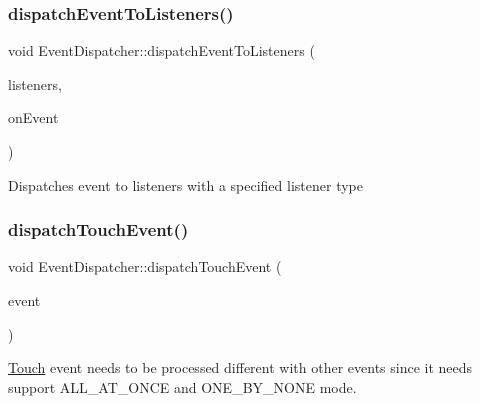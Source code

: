 \subsubsection{\texorpdfstring{dispatch\+Event\+To\+Listeners()}{dispatchEventToListeners()}\hspace{0.1cm}{\footnotesize\ttfamily [2/2]}}
{\footnotesize\ttfamily void Event\+Dispatcher\+::dispatch\+Event\+To\+Listeners (\begin{DoxyParamCaption}\item[{\hyperlink{classEventDispatcher_1_1EventListenerVector}{Event\+Listener\+Vector} $\ast$}]{listeners,  }\item[{const std\+::function$<$ bool(\hyperlink{classEventListener}{Event\+Listener} $\ast$)$>$ \&}]{on\+Event }\end{DoxyParamCaption})\hspace{0.3cm}{\ttfamily [protected]}}

Dispatches event to listeners with a specified listener type \mbox{\label{classEventDispatcher_a5dd8af31b358bbe217180ac29909b3aa}} 
\subsubsection{\texorpdfstring{dispatch\+Touch\+Event()}{dispatchTouchEvent()}\hspace{0.1cm}{\footnotesize\ttfamily [1/2]}}
{\footnotesize\ttfamily void Event\+Dispatcher\+::dispatch\+Touch\+Event (\begin{DoxyParamCaption}\item[{\hyperlink{classEventTouch}{Event\+Touch} $\ast$}]{event }\end{DoxyParamCaption})\hspace{0.3cm}{\ttfamily [protected]}}

\hyperlink{classTouch}{Touch} event needs to be processed different with other events since it needs support A\+L\+L\+\_\+\+A\+T\+\_\+\+O\+N\+CE and O\+N\+E\+\_\+\+B\+Y\+\_\+\+N\+O\+NE mode. \mbox{\label{classEventDispatcher_a5dd8af31b358bbe217180ac29909b3aa}} 
